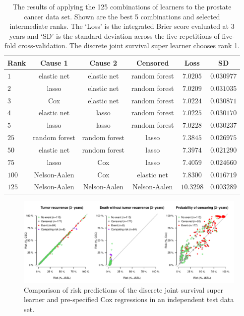\documentclass[a4paper,danish]{article}
\newcommand{\1}{\mathds{1}}
\theoremstyle{plain} %
\numberwithin{theorem}{section}
\theoremstyle{definition} %
\theoremstyle{remark}
\begin{document}
\begin{table}[ht]
  \caption{The results of applying the 125 combinations of learners to
the prostate cancer data set. Shown are the best 5 combinations and
selected intermediate ranks.  The `Loss' is the integrated Brier
score evaluated at 3 years and `SD' is the standard deviation
across the five repetitions of five-fold cross-validation. The discrete
joint survival super learner chooses rank 1. }
\begin{center}  
\begin{tabular}{ l| c c c c c } 
  Rank&Cause 1&Cause 2&Censored&Loss&SD \\\hline
  $   1 $&elastic net&elastic net&random forest&$  7.0205 $&$ 0.030977 $ \\
  $   2 $&lasso&elastic net&random forest&$  7.0209 $&$ 0.031035 $ \\
  $   3 $&Cox&elastic net&random forest&$  7.0224 $&$ 0.030871 $ \\
  $   4 $&elastic net&lasso&random forest&$  7.0225 $&$ 0.030170 $ \\
  $   5 $&lasso&lasso&random forest&$  7.0228 $&$ 0.030237 $ \\
  $  25 $&random forest&random forest&lasso&$  7.3845 $&$ 0.026975 $ \\
  $  50 $&elastic net&random forest&lasso&$  7.3974 $&$ 0.021290 $ \\
  $  75 $&lasso&Cox&lasso&$  7.4059 $&$ 0.024660 $ \\
  $ 100 $&Nelson-Aalen&Cox&elastic net&$  7.8300 $&$ 0.016719 $ \\
  $ 125 $&Nelson-Aalen&Nelson-Aalen&Nelson-Aalen&$ 10.3298 $&$ 0.003289 $ \\
\end{tabular}\label{tab:1}
\end{center}
\end{table}


\begin{figure}[ht]
  \includegraphics[width=14cm]{risks_zelefsky_single.pdf}
 \caption{Comparison of risk predictions of the discrete joint
   survival super learner and pre-specified Cox regressions in an
   independent test data set.}
\label{fig:zelefski-real}
\end{figure}
\end{document}
